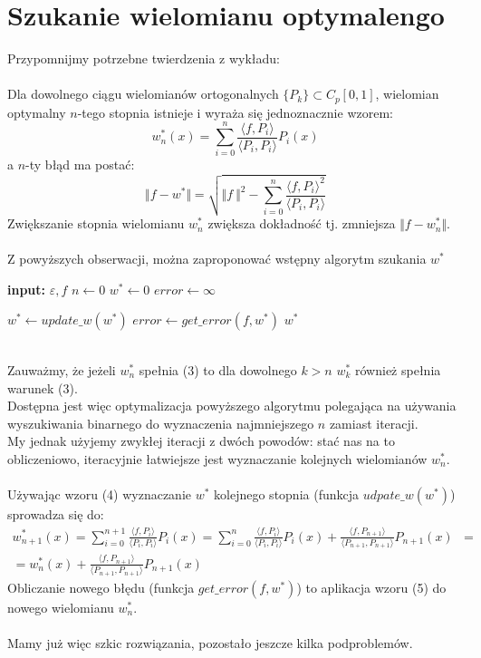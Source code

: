\documentclass{article}
\begin{document}
\section{Szukanie wielomianu optymalengo}
Przypomnijmy potrzebne twierdzenia z wykładu:\\\\
Dla dowolnego ciągu wielomianów ortogonalnych $\{P_k\} \subset C_p[0,1]$, wielomian optymalny $n$-tego stopnia istnieje i wyraża się jednoznacznie wzorem:
\begin{equation}
w_n^*(x) = \sum_{i=0}^n \frac{\langle f,P_i\rangle}{\langle P_i,P_i\rangle}P_i(x)
\end{equation}
a $n$-ty błąd ma postać:
\begin{equation}
\Vert f - w^*\Vert = \sqrt{\Vert f \ \Vert^2 - \sum_{i=0}^n \frac{\langle f,P_i\rangle^2}{\langle P_i,P_i\rangle}}
\end{equation}
Zwiększanie stopnia wielomianu $w_n^*$ zwiększa dokładność tj. zmniejsza $\Vert f - w_n^*\Vert$.\\\\
Z powyższych obserwacji, można zaproponować wstępny algorytm szukania $w^*$
\begin{algorithm}
\begin{algorithmic}
\STATE \textbf{input:} $\varepsilon, f$
\STATE $n \leftarrow 0$
\STATE $w^* \leftarrow 0$
\STATE $error \leftarrow \infty$

\STATE $w^* \leftarrow update\_w(w^*)$
\STATE $error \leftarrow get\_error(f,w^*)$
\ENDWHILE
\RETURN $w^*$
\end{algorithmic}
\end{algorithm}
\\Zauważmy, że jeżeli $w_n^*$ spełnia (3) to dla dowolnego $k > n$ $w_k^*$ również spełnia warunek (3).\\
Dostępna jest więc optymalizacja powyższego algorytmu polegająca na używania wyszukiwania binarnego do wyznaczenia  najmniejszego $n$ zamiast iteracji.\\
My jednak użyjemy zwykłej iteracji z dwóch powodów: stać nas na to obliczeniowo, iteracyjnie łatwiejsze jest wyznaczanie kolejnych wielomianów $w_n^*$.\\\\
Używając wzoru (4) wyznaczanie $w^*$ kolejnego stopnia (funkcja $udpate\_w(w^*)$) sprowadza się do:
\begin{align*}
w_{n+1}^*(x) = \sum_{i=0}^{n+1} \frac{\langle f,P_i\rangle}{\langle P_i,P_i\rangle}P_i(x) =\sum_{i=0}^{n} \frac{\langle f,P_i\rangle}{\langle P_i,P_i\rangle}P_i(x) + \frac{\langle f,P_{n+1}\rangle}{\langle P_{n+1},P_{n+1}\rangle}P_{n+1}(x) &= \\ = w_n^*(x) + \frac{\langle f,P_{n+1}\rangle}{\langle P_{n+1},P_{n+1}\rangle}P_{n+1}(x) 
\end{align*}
Obliczanie nowego błędu (funkcja $get\_error(f,w^*)$) to aplikacja wzoru (5) do nowego wielomianu $w_n^*$.\\\\
Mamy już więc szkic rozwiązania, pozostało jeszcze kilka podproblemów.
\end{document}
